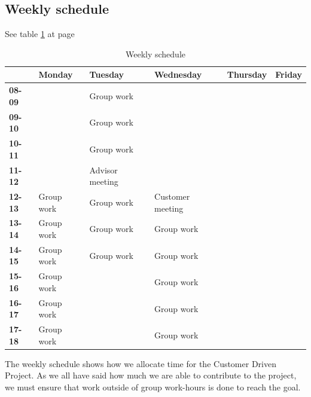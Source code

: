 \subsection{Weekly schedule}
See table \ref{tab:weeklyschedule} at page \pageref{tab:weeklyschedule}
\begin{table}
\begin{tabular}{l|l|l|l|l|l} \hline
 & \textbf{Monday} & \textbf{Tuesday} & \textbf{Wednesday} & \textbf{Thursday} & \textbf{Friday} \\ \hline \hline
\textbf{08-09} &  & Group work &  &  &  \\
\textbf{09-10} &  & Group work &  &  &  \\
\textbf{10-11} &  & Group work &  &  &  \\
\textbf{11-12} &  & Advisor meeting & &  &  \\
\textbf{12-13} & Group work & Group work & Customer meeting &  &  \\
\textbf{13-14} & Group work & Group work & Group work &  &  \\
\textbf{14-15} & Group work & Group work & Group work &  &  \\
\textbf{15-16} & Group work &  & Group work &  &  \\
\textbf{16-17} & Group work &  & Group work &  &  \\
\textbf{17-18} & Group work &  & Group work &  & \\ \hline
\end{tabular}
\caption {Weekly schedule} \label{tab:weeklyschedule}
\end{table}
The weekly schedule shows how we allocate time for the Customer Driven Project. As we all have said how much we are able to contribute to the project, we must ensure that work outside of group work-hours is done to reach the goal.

